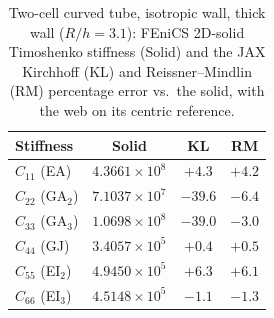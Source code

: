 \begin{table}[htpb]
\centering
\caption{Two-cell curved tube, isotropic wall, thick wall ($R/h = 3.1$): FEniCS 2D-solid Timoshenko stiffness (Solid) and the JAX Kirchhoff (KL) and Reissner--Mindlin (RM) percentage error vs.\ the solid, with the web on its centric reference.}
\label{tab:mc2_iso_thick}
\begin{tabular}{lccc}
\hline
Stiffness & Solid & KL & RM \\
\hline
$C_{11}$ (EA) & $4.3661{\times}10^{8}$ & $+4.3$ & $+4.2$ \\
$C_{22}$ (GA$_2$) & $7.1037{\times}10^{7}$ & $-39.6$ & $-6.4$ \\
$C_{33}$ (GA$_3$) & $1.0698{\times}10^{8}$ & $-39.0$ & $-3.0$ \\
$C_{44}$ (GJ) & $3.4057{\times}10^{5}$ & $+0.4$ & $+0.5$ \\
$C_{55}$ (EI$_2$) & $4.9450{\times}10^{5}$ & $+6.3$ & $+6.1$ \\
$C_{66}$ (EI$_3$) & $4.5148{\times}10^{5}$ & $-1.1$ & $-1.3$ \\
\hline
\end{tabular}
\end{table}
